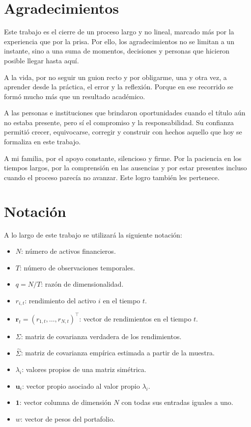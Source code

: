 \documentclass[letterpaper,12pt,oneside]{book}
\begin{document}
\chapter{Agradecimientos}

Este trabajo es el cierre de un proceso largo y no lineal, marcado más por la experiencia que por la prisa.
Por ello, los agradecimientos no se limitan a un instante, sino a una suma de momentos, decisiones y personas que hicieron posible llegar hasta aquí.

A la vida, por no seguir un guion recto y por obligarme, una y otra vez, a aprender desde la práctica, el error y la reflexión. Porque en ese recorrido se formó mucho más que un resultado académico.

A las personas e instituciones que brindaron oportunidades cuando el título aún no estaba presente,
pero sí el compromiso y la responsabilidad. Su confianza permitió crecer, equivocarse, corregir y construir con hechos aquello que hoy se formaliza en este trabajo.

A mi familia, por el apoyo constante, silencioso y firme. Por la paciencia en los tiempos largos, por la comprensión en las ausencias y por estar presentes incluso cuando el proceso parecía no avanzar. Este logro también les pertenece.

\chapter{Notación}
A lo largo de este trabajo se utilizará la siguiente notación:

\begin{itemize}
  \item $N$: número de activos financieros.
  \item $T$: número de observaciones temporales.
  \item $q = N/T$: razón de dimensionalidad.
  \item $r_{i,t}$: rendimiento del activo $i$ en el tiempo $t$.
  \item $\mathbf{r}_t = (r_{1,t}, \dots, r_{N,t})^\top$: vector de rendimientos en el tiempo $t$.
  \item $\Sigma$: matriz de covarianza verdadera de los rendimientos.
  \item $\hat{\Sigma}$: matriz de covarianza empírica estimada a partir de la muestra.
  \item $\lambda_i$: valores propios de una matriz simétrica.
  \item $\mathbf{u}_i$: vector propio asociado al valor propio $\lambda_i$.
  \item $\mathbf{1}$: vector columna de dimensión $N$ con todas sus entradas iguales a uno.
  \item $w$: vector de pesos del portafolio.
\end{itemize}
\end{document}
